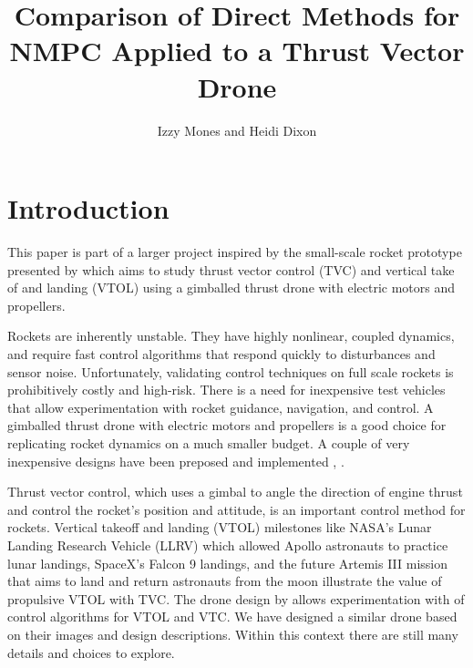 \documentclass[]{article}
\title{Comparison of Direct Methods for NMPC  Applied to  a Thrust Vector Drone}
\author{Izzy Mones and Heidi Dixon}
\begin{document}
\maketitle
	
\section*{Introduction}	
	This paper is  part of a larger project inspired by the small-scale rocket prototype presented by \cite{TVCDrone} which aims to study thrust vector control (TVC) and vertical take of and landing (VTOL) using a gimballed thrust drone with electric motors and propellers.  
	
	Rockets are inherently unstable. They have highly nonlinear, coupled dynamics,  and require fast control algorithms that respond quickly to disturbances and sensor noise. 
	Unfortunately, validating control techniques on full scale rockets is prohibitively costly and high-risk. There is a need for inexpensive test vehicles that allow experimentation with rocket guidance, navigation, and control. 
	A gimballed thrust drone with electric motors and propellers is a good choice for replicating rocket dynamics on a much smaller budget. A couple of very inexpensive designs have been preposed and implemented  \citep{cheapTVC}, \citep{TVCDrone}.

	Thrust vector control, which uses a gimbal to angle the direction of engine thrust and control the rocket's position and attitude, is an important control method for rockets.
	Vertical takeoff and landing (VTOL) milestones like NASA's Lunar Landing Research Vehicle (LLRV) which allowed Apollo astronauts to practice lunar landings, SpaceX's Falcon 9 landings, and the future Artemis III mission that aims to land and return astronauts from the moon illustrate the value of propulsive VTOL with TVC. 
	The drone design by \cite{TVCDrone} allows experimentation with of control algorithms for VTOL and VTC. We have designed a similar drone based on their images and design descriptions. Within this context there are still many details and choices to explore. 
\end{document}
